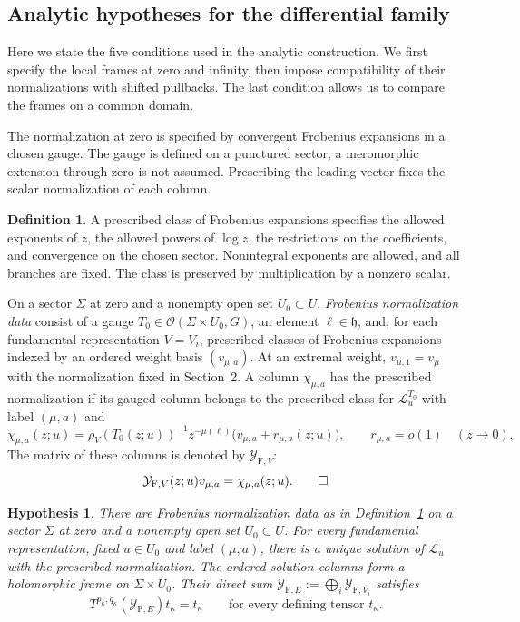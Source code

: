 \documentclass[11pt,leqno]{amsart}
\numberwithin{equation}{section}
\theoremstyle{plain}
\theoremstyle{definition}
\newtheorem{definition}[theorem]{Definition}
\theoremstyle{plain}
\newtheorem{hypothesis}{Hypothesis}
\theoremstyle{definition}
\theoremstyle{remark}
\newcommand{\gh}{\mathfrak h}
\begin{document}
\subsection{Analytic hypotheses for the differential family}\label{sec:five-analytic-hypotheses}
Here we state the five conditions used in the analytic construction.  We first specify the local frames at zero and infinity, then impose compatibility of their normalizations with shifted pullbacks.  The last condition allows us to compare the frames on a common domain.

The normalization at zero is specified by convergent Frobenius expansions in a chosen gauge.  The gauge is defined on a punctured sector; a meromorphic extension through zero is not assumed.  Prescribing the leading vector fixes the scalar normalization of each column.

\begin{definition}\label{def:Frobenius-classes}
A prescribed class of Frobenius expansions specifies the allowed exponents of $z$, the allowed powers of $\log z$, the restrictions on the coefficients, and convergence on the chosen sector.  Nonintegral exponents are allowed, and all branches are fixed.  The class is preserved by multiplication by a nonzero scalar.

On a sector $\Sigma$ at zero and a nonempty open set $U_0\subset U$, \emph{Frobenius normalization data} consist of a gauge $T_0\in\mathcal O(\Sigma\times U_0,G)$, an element $\ell\in\gh$, and, for each fundamental representation $V=V_i$, prescribed classes of Frobenius expansions indexed by an ordered weight basis $(v_{\mu,a})$.  At an extremal weight, $v_{\mu,1}=v_\mu$ with the normalization fixed in Section~2.  A column $\chi_{\mu,a}$ has the prescribed normalization if its gauged column belongs to the prescribed class for $\mathcal L_u^{T_0}$ with label $(\mu,a)$ and
\begin{equation}\label{eq:frob-general}
 \chi_{\mu,a}(z;u)
   =\rho_V(T_0(z;u))^{-1}z^{-\mu(\ell)}
       \bigl(v_{\mu,a}+r_{\mu,a}(z;u)\bigr),
 \qquad r_{\mu,a}=o(1)\quad(z\to0).
\end{equation}
The matrix of these columns is denoted by $\mathcal Y_{\mathrm F,V}$:
\[
 \mathcal Y_{\mathrm F,V}(z;u)v_{\mu,a}=\chi_{\mu,a}(z;u).
\qedhere
\]
\end{definition}

\begin{hypothesis}\label{hyp:frob}
There are Frobenius normalization data as in Definition~\ref{def:Frobenius-classes} on a sector $\Sigma$ at zero and a nonempty open set $U_0\subset U$.  For every fundamental representation, fixed $u\in U_0$ and label $(\mu,a)$, there is a unique solution of $\mathcal L_u$ with the prescribed normalization.  The ordered solution columns form a holomorphic frame on $\Sigma\times U_0$.  Their direct sum $\mathcal Y_{\mathrm F,E}:=\bigoplus_i\mathcal Y_{\mathrm F,V_i}$ satisfies
\[
 T^{p_\kappa,q_\kappa}(\mathcal Y_{\mathrm F,E})t_\kappa=t_\kappa
 \qquad\text{for every defining tensor }t_\kappa.
\]
\end{hypothesis}
\end{document}
